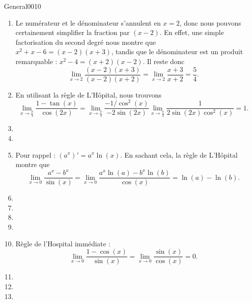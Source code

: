 \begin{corrige}{General0010}

\begin{enumerate}

\item
Le numérateur et le dénominateur s'annulent en $x=2$, donc nous pouvons certainement simplifier la fraction par $(x-2)$. En effet, une simple factorisation du second degré nous montre que $x^2+x-6=(x-2)(x+3)$, tandis que le dénominateur est un produit remarquable : $x^2-4=(x+2)(x-2)$. Il reste donc
\begin{equation}
	\lim_{x\to 2} \frac{ (x-2)(x+3) }{ (x-2)(x+2) }=\lim_{x\to 2} \frac{ x+3 }{ x+2 }=\frac{ 5 }{ 4 }.
\end{equation}

\item
En utilisant la règle de L'Hôpital, nous trouvons
\begin{equation}
	\lim_{x\to \frac{ \pi }{ 4 }} \frac{ 1-\tan(x) }{ \cos(2x) }=\lim_{x\to \frac{ \pi }{ 4 }} \frac{ -1/\cos^2(x) }{ -2\sin(2x) }\lim_{x\to \frac{ \pi }{ 4 }} \frac{ 1 }{ 2\sin(2x)\cos^2(x) }=1.
\end{equation}

\item
\item

\item
Pour rappel : $(a^x)'=a^x\ln(x)$. En sachant cela, la règle de L'Hôpital montre que
\begin{equation}
	\lim_{x\to 0} \frac{ a^x-b^x }{ \sin(x) }=\lim_{x\to 0} \frac{ a^x\ln(a)-b^x\ln(b) }{ \cos(x) }=\ln(a)-\ln(b).
\end{equation}

\item
\item
\item
\item
\item
Règle de l'Hospital immédiate :
\begin{equation}
	\lim_{x\to 0} \frac{ 1-\cos(x) }{ \sin(x) }=\lim_{x\to 0} \frac{ \sin(x) }{ \cos(x) }=0.
\end{equation}

\item
\item
\item


\end{enumerate}
\end{corrige}

